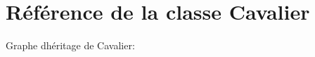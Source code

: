 \hypertarget{classCavalier}{}\section{Référence de la classe Cavalier}
\label{classCavalier}


Graphe d\textquotesingle{}héritage de Cavalier\+:
